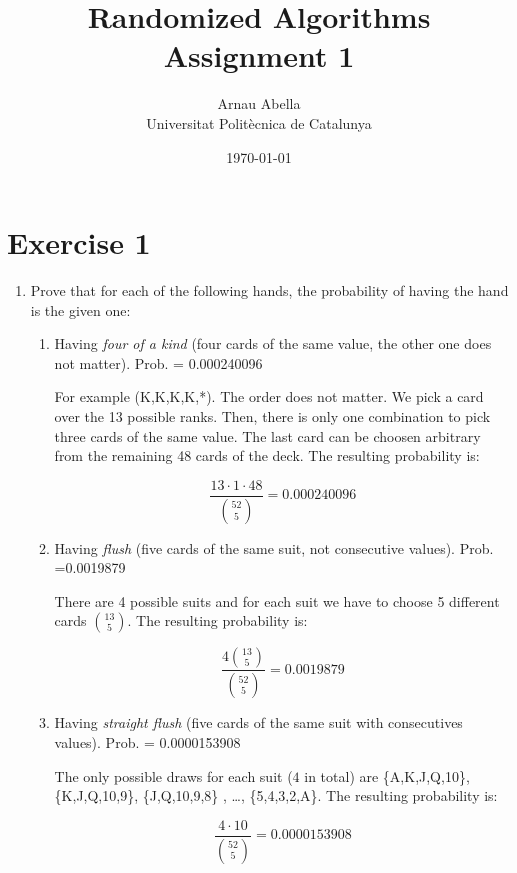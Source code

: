 \documentclass[12pt, a4paper]{article} %
\title{%
  Randomized Algorithms\\
  \large{Assignment 1}
}
\author{%
  Arnau Abella \\
  \large{Universitat Polit\`ecnica de Catalunya}
}
\date{\today}
\begin{document}
\maketitle


\section*{Exercise 1}%
\label{sec:exercise_1}

\begin{enumerate}[label=(\alph*)]
  \item Prove that for each of the following hands, the probability of having the hand is the given one:
    \begin{enumerate}[label=\textbullet]
      \item Having \textit{four of a kind} (four cards of the same value, the other one does not matter). Prob. = 0.000240096

        For example (K,K,K,K,*). The order does not matter. We pick a card over the 13 possible ranks. Then, there is only one combination to pick three cards of the same value. The last card can be choosen arbitrary from the remaining 48 cards of the deck. The resulting probability is:

        \begin{equation}
          \frac{13 \cdot 1 \cdot 48}{\binom{52}{5}} = 0.000240096
        \end{equation}

      \item Having \textit{flush} (five cards of the same suit, not consecutive values). Prob. =0.0019879

        There are 4 possible suits and for each suit we have to choose 5 different cards $\binom{13}{5}$. The resulting probability is:

        \begin{equation}
          \frac{4 \binom{13}{5}}{\binom{52}{5}} = 0.0019879
        \end{equation}

      \item Having \textit{straight flush}  (five cards of the same suit with consecutives values). Prob. = 0.0000153908

        The only possible draws for each suit ($4$ in total) are \{A,K,J,Q,10\}, \{K,J,Q,10,9\}, \{J,Q,10,9,8\} , \ldots, \{5,4,3,2,A\}. The resulting probability is:

        \begin{equation}
          \frac{4 \cdot 10}{\binom{52}{5}} = 0.0000153908
        \end{equation}


\end{enumerate}
\end{enumerate}
\end{document}

